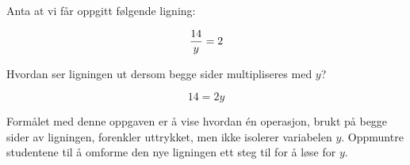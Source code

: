 

Anta at vi får oppgitt følgende ligning:

$${14 \over y} = 2$$

Hvordan ser ligningen ut dersom begge sider multipliseres med $y$?







$$14 = 2y$$







Formålet med denne oppgaven er å vise hvordan én operasjon, brukt på begge sider av ligningen, forenkler uttrykket, men ikke isolerer variabelen $y$. Oppmuntre studentene til å omforme den nye ligningen ett steg til for å løse for $y$.


